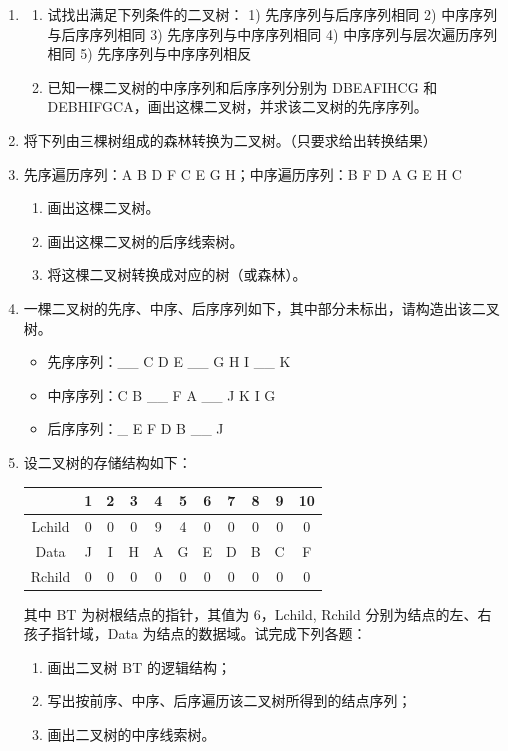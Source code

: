 \documentclass[12pt, a4paper]{article}
\begin{document}
\begin{enumerate}
	\item
	      \begin{enumerate}
		      \item[①] 试找出满足下列条件的二叉树：
		            1) 先序序列与后序序列相同
		            2) 中序序列与后序序列相同
		            3) 先序序列与中序序列相同
		            4) 中序序列与层次遍历序列相同
		            5) 先序序列与中序序列相反
		      \item[②] 已知一棵二叉树的中序序列和后序序列分别为 DBEAFIHCG 和 DEBHIFGCA，画出这棵二叉树，并求该二叉树的先序序列。
	      \end{enumerate}

	\item 将下列由三棵树组成的森林转换为二叉树。（只要求给出转换结果）

	\item 先序遍历序列：A B D F C E G H；中序遍历序列：B F D A G E H C
	      \begin{enumerate}
		      \item 画出这棵二叉树。
		      \item 画出这棵二叉树的后序线索树。
		      \item 将这棵二叉树转换成对应的树（或森林）。
	      \end{enumerate}

	\item 一棵二叉树的先序、中序、后序序列如下，其中部分未标出，请构造出该二叉树。
	      \begin{itemize}
		      \item 先序序列：\_\_ C D E \_\_ G H I \_\_ K
		      \item 中序序列：C B \_\_ F A \_\_ J K I G
		      \item 后序序列：\_ E F D B \_\_ J
	      \end{itemize}

	\item 设二叉树的存储结构如下：
	      \begin{center}
		      \begin{tabular}{|c|c|c|c|c|c|c|c|c|c|c|}
			      \hline
			             & 1 & 2 & 3 & 4 & 5 & 6 & 7 & 8 & 9 & 10 \\ \hline
			      Lchild & 0 & 0 & 0 & 9 & 4 & 0 & 0 & 0 & 0 & 0  \\ \hline
			      Data   & J & I & H & A & G & E & D & B & C & F  \\ \hline
			      Rchild & 0 & 0 & 0 & 0 & 0 & 0 & 0 & 0 & 0 & 0  \\ \hline
		      \end{tabular}
	      \end{center}
	      其中 BT 为树根结点的指针，其值为 6，Lchild, Rchild 分别为结点的左、右孩子指针域，Data 为结点的数据域。试完成下列各题：
	      \begin{enumerate}
		      \item 画出二叉树 BT 的逻辑结构；
		      \item 写出按前序、中序、后序遍历该二叉树所得到的结点序列；
		      \item 画出二叉树的中序线索树。
	      \end{enumerate}


\end{enumerate}
\end{document}
